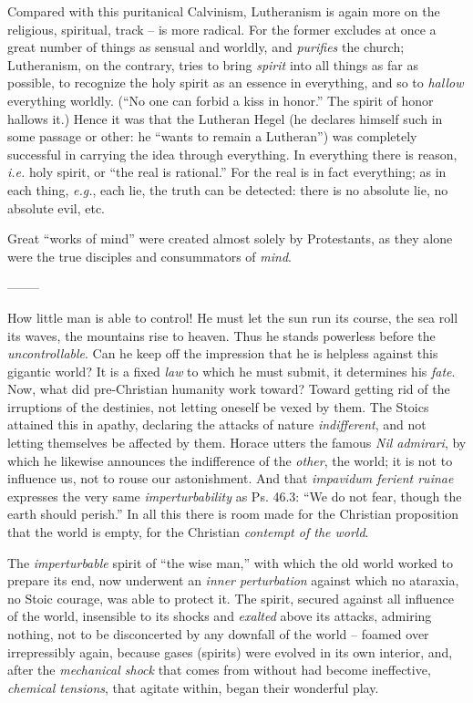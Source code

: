 Compared with this puritanical Calvinism, Lutheranism is again more on the 
religious, spiritual, track -- is more radical. For the former excludes at 
once a great number of things as sensual and worldly, and \textit{purifies} 
the church; Lutheranism, on the contrary, tries to bring \textit{spirit} into 
all things as far as possible, to recognize the holy spirit as an essence in 
everything, and so to \textit{hallow} everything worldly. (``No one can 
forbid a kiss in honor.'' The spirit of honor hallows it.) Hence it was that 
the Lutheran Hegel (he declares himself such in some passage or other: he 
``wants to remain a Lutheran'') was completely successful in carrying the 
idea through everything. In everything there is reason, \textit{i.e.} holy 
spirit, or ``the real is rational.'' For the real is in fact everything; as 
in each thing, \textit{e.g.}, each lie, the truth can be detected: there is 
no absolute lie, no absolute evil, etc.

Great ``works of mind'' were created almost solely by Protestants, as they 
alone were the true disciples and consummators of \textit{mind}.

\begin{center}
--------\end{center}


How little man is able to control! He must let the sun run its course, the sea 
roll its waves, the mountains rise to heaven. Thus he stands powerless before 
the \textit{uncontrollable}. Can he keep off the impression that he is 
helpless against this gigantic world? It is a fixed \textit{law} to which he 
must submit, it determines his \textit{fate}. Now, what did pre-Christian 
humanity work toward? Toward getting rid of the irruptions of the destinies, 
not letting oneself be vexed by them. The Stoics attained this in apathy, 
declaring the attacks of nature \textit{indifferent}, and not letting 
themselves be affected by them. Horace utters the famous \textit{Nil 
admirari}, by which he likewise announces the indifference of the 
\textit{other}, the world; it is not to influence us, not to rouse our 
astonishment. And that \textit{impavidum ferient ruinae} expresses the very 
same \textit{imperturbability} as Ps. 46.3: ``We do not fear, though the 
earth should perish.'' In all this there is room made for the Christian 
proposition that the world is empty, for the Christian \textit{contempt of the 
world}.

The \textit{imperturbable} spirit of ``the wise man,'' with which the old 
world worked to prepare its end, now underwent an \textit{inner perturbation} 
against which no ataraxia, no Stoic courage, was able to protect it. The 
spirit, secured against all influence of the world, insensible to its shocks 
and \textit{exalted} above its attacks, admiring nothing, not to be 
disconcerted by any downfall of the world -- foamed over irrepressibly again, 
because gases (spirits) were evolved in its own interior, and, after the 
\textit{mechanical shock} that comes from without had become ineffective, 
\textit{chemical tensions}, that agitate within, began their wonderful play.

